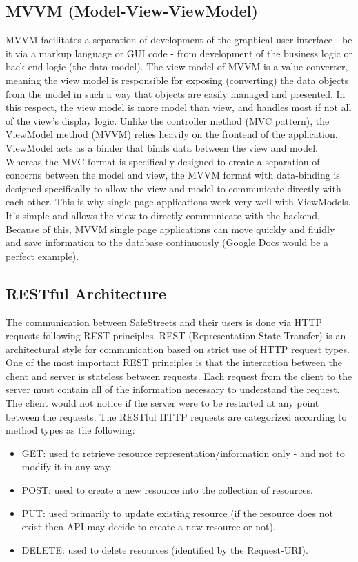 \documentclass[../RASD.tex]{subfiles}
\begin{document}
    \subsection{MVVM (Model-View-ViewModel)}\label{subsec:mvvmmodel-view-viewmodel}
    MVVM facilitates a separation of development of the graphical user interface - be it via a markup language or GUI code -
    from development of the business logic or back-end logic (the data model).
    The view model of MVVM is a value converter, meaning the view model is responsible for exposing (converting) the data objects from the model
    in such a way that objects are easily managed and presented.
    In this respect, the view model is more model than view, and handles most if not all of the view's display logic.
    Unlike the controller method (MVC pattern), the ViewModel method (MVVM) relies heavily on the frontend of the application.
    ViewModel acts as a binder that binds data between the view and model.
    Whereas the MVC format is specifically designed to create a separation of concerns between the model and view,
    the MVVM format with data-binding is designed specifically to allow the view and model to communicate directly with each other.
    This is why single page applications work very well with ViewModels.
    It’s simple and allows the view to directly communicate with the backend.
    Because of this, MVVM single page applications can move quickly and fluidly and save information to the database continuously
    (Google Docs would be a perfect example).

    \subsection{RESTful Architecture}\label{subsec:restful-architecture}
    The communication between SafeStreets and their users is done via HTTP requests following REST principles.
    REST (Representation State Transfer) is an architectural style for communication based on strict use of HTTP request types.
    One of the most important REST principles is that the interaction between the client and server is stateless between requests.
    Each request from the client to the server must contain all of the information necessary to understand the request.
    The client would not notice if the server were to be restarted at any point between the requests.
    The RESTful HTTP requests are categorized according to method types as the following:
    \begin{itemize}
        \item GET: used to retrieve resource representation/information only - and not to modify it in any way.
        \item POST: used to create a new resource into the collection of resources.
        \item PUT: used primarily to update existing resource (if the resource does not exist
        then API may decide to create a new resource or not).
        \item DELETE: used to delete resources (identified by the Request-URI).
    \end{itemize}
    \newpage
\end{document}
